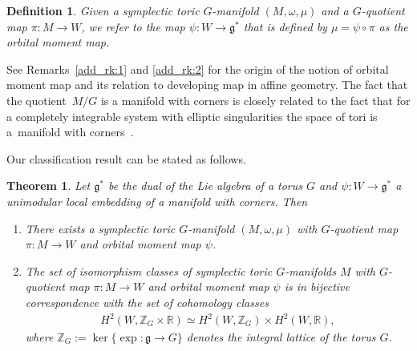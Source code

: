 \documentclass[10pt,a4paper]{amsart}
\numberwithin{equation}{section}
\newtheorem{Theorem}[Lemma]{Theorem}
\newtheorem{Definition}[Lemma]{Definition}
\begin{document}
\begin{Definition} \label{def:orbital_moment_map}\sloppy
  Given a symplectic toric $G$-manifold $(M,\omega, \mu)$
  and a $G$-quotient map \mbox{$\pi \colon M \to W$},
  we refer to the map $\psi\colon W \to {\mathfrak g}^*$
  that is def\/ined by $\mu = \psi \circ \pi$ as the {\em orbital moment map}.
\end{Definition}

See Remarks~\ref{add_rk:1} and \ref{add_rk:2} for the origin of the notion of
orbital moment map and its relation to  developing map in
af\/f\/ine geometry.  The fact that the quotient~$M/G$ is a manifold with
corners is closely related to the fact that for a completely
integrable system with elliptic singularities the space of tori is a~manifold with corners~\cite{BM,Y}.

Our classif\/ication result can be stated as follows.

\begin{Theorem} \label{thm:main}
Let ${\mathfrak g}^*$ be the dual
  of the Lie algebra of a torus $G$ and $\psi\colon W\to {\mathfrak g}^*$ a unimodular
  local embedding of a manifold with corners.  Then
\begin{enumerate}[$1.$]\itemsep=0pt
\item\label{1}
  There exists a symplectic toric $G$-manifold $(M,\omega, \mu)$
  with $G$-quotient map $\pi\colon M \to W$
  and orbital moment map $\psi$.
\item \label{2} The set of isomorphism classes
  of symplectic toric $G$-manifolds $M$
  with $G$-quotient map $\pi\colon M \to W$
  and orbital moment map $\psi$ is in bijective
  correspondence with the set of cohomology classes
\begin{gather*}
H^2 (W, {\mathbb Z}_G\times {\mathbb R}) \simeq H^2 (W, {\mathbb Z}_G)\times H^2 (W, {\mathbb R}),
\end{gather*}
where ${\mathbb Z}_G:=\ker \{\exp\colon {\mathfrak g}\to G\}$ denotes the integral lattice of
the torus $G$.
\end{enumerate}
\end{Theorem}
\end{document}
